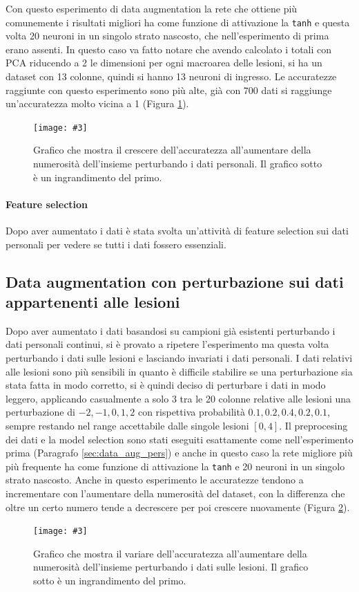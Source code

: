 \documentclass[12pt, twoside, letterpaper]{report}
\newcommand{\img}[4] {
	\begin{figure}
		\centering
		\texttt{[image: \#3]}\\
		\caption{#1}
		\label{fig:#4}
	\end{figure}
}
\begin{document}
			Con questo esperimento di data augmentation la rete che ottiene più comunemente i risultati migliori ha come funzione di attivazione la \texttt{tanh} e questa volta 20 neuroni in un singolo strato nascosto, che nell'esperimento di prima erano assenti. In questo caso va fatto notare che avendo calcolato i totali con PCA riducendo a 2 le dimensioni per ogni macroarea delle lesioni, si ha un dataset con 13 colonne, quindi si hanno 13 neuroni di ingresso. Le accuratezze raggiunte con questo esperimento sono più alte, già con 700 dati si raggiunge un'accuratezza molto vicina a 1 (Figura \ref{fig:accuracy_data_aug_pers}).
			
			\img{Grafico che mostra il crescere dell'accuratezza all'aumentare della numerosità dell'insieme perturbando i dati personali. Il grafico sotto è un ingrandimento del primo.}{0.35}{accuracy_data_aug_pers.png}{accuracy_data_aug_pers}
			
			\paragraph{Feature selection} Dopo aver aumentato i dati è stata svolta un'attività di feature selection sui dati personali per vedere se tutti i dati fossero essenziali. 

		\subsection{Data augmentation con perturbazione sui dati appartenenti alle lesioni} \label{sec:data_aug_les}
			Dopo aver aumentato i dati basandosi su campioni già esistenti perturbando i dati personali continui, si è provato a ripetere l'esperimento ma questa volta perturbando i dati sulle lesioni e lasciando invariati i dati personali. I dati relativi alle lesioni sono più sensibili in quanto è difficile stabilire se una perturbazione sia stata fatta in modo corretto, si è quindi deciso di perturbare i dati in modo leggero, applicando casualmente a solo 3 tra le 20 colonne relative alle lesioni una perturbazione di $-2, -1, 0, 1, 2$ con rispettiva probabilità $0.1, 0.2, 0.4, 0.2, 0.1$, sempre restando nel range accettabile dalle singole lesioni $[0,4]$. Il preprocesing dei dati e la model selection sono stati eseguiti esattamente come nell'esperimento prima (Paragrafo \ref{sec:data_aug_pers}) e anche in questo caso la rete migliore più più frequente ha come funzione di attivazione la \texttt{tanh} e 20 neuroni in un singolo strato nascosto. Anche in questo esperimento le accuratezze tendono a incrementare con l'aumentare della numerosità del dataset, con la differenza che oltre un certo numero tende a decrescere per poi crescere nuovamente (Figura \ref{fig:accuracy_data_aug_lesioni}). 
			\img{Grafico che mostra il variare dell'accuratezza all'aumentare della numerosità dell'insieme perturbando i dati sulle lesioni. Il grafico sotto è un ingrandimento del primo.}{0.35}{accuracy_data_aug_lesioni.png}{accuracy_data_aug_lesioni}
			
\end{document}
